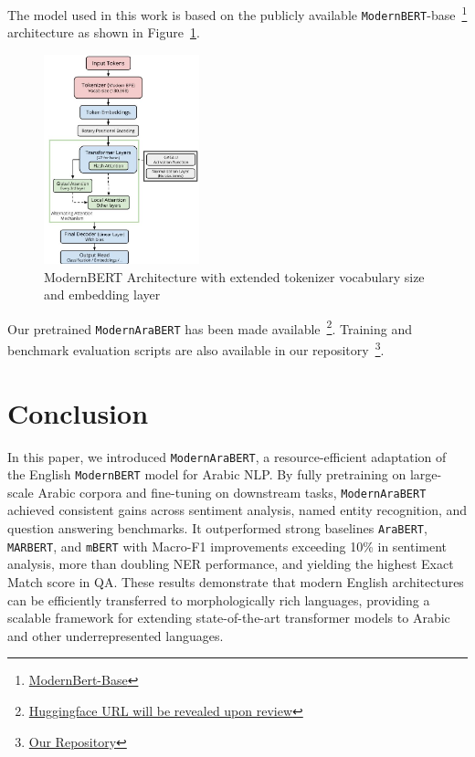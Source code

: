 \documentclass[11pt]{article}
\begin{document}
The model used in this work is based on the publicly available \texttt{ModernBERT}-base~\footnote{\href{https://huggingface.co/answerdotai/ModernBERT-base}{ModernBert-Base}} architecture as shown in Figure~\ref{fig:model}.


\begin{figure}[h!]
    \centering
    \includegraphics[width=0.4\textwidth]{
      latex/ModernArabert (1).jpg
    } %
    \caption{ModernBERT Architecture with extended tokenizer vocabulary size and
    embedding layer}
    \label{fig:model}
\end{figure}

Our pretrained \texttt{ModernAraBERT} has been made available~\footnote{\href{http://}{Huggingface URL will be revealed upon review}}. Training and benchmark evaluation scripts are also available in our repository~\footnote{\href{https://anonymous.4open.science/r/ModernAraBERT-823C/}{Our Repository}}.



\section{Conclusion}
In this paper, we introduced \texttt{ModernAraBERT}, a resource-efficient adaptation of the English \texttt{ModernBERT} model for Arabic NLP. By fully pretraining on large-scale Arabic corpora and fine-tuning on downstream tasks, \texttt{ModernAraBERT} achieved consistent gains across sentiment analysis, named entity recognition, and question answering benchmarks. It outperformed strong baselines \texttt{AraBERT}, \texttt{MARBERT}, and \texttt{mBERT} with Macro-F1 improvements exceeding 10\% in sentiment analysis, more than doubling NER performance, and yielding the highest Exact Match score in QA. These results demonstrate that modern English architectures can be efficiently transferred to morphologically rich languages, providing a scalable framework for extending state-of-the-art transformer models to Arabic and other underrepresented languages.
\end{document}
